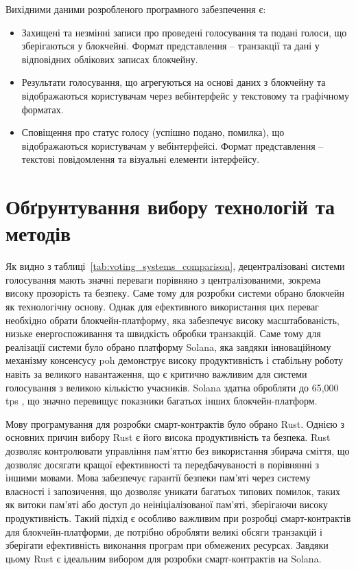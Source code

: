\documentclass[14pt]{extreport}
\begin{document}
  Вихідними даними розробленого програмного забезпечення є:
  
  \begin{itemize}
    \item Захищені та незмінні записи про проведені голосування та подані голоси, що зберігаються у блокчейні. Формат представлення – транзакції та дані у відповідних облікових записах блокчейну.
    \item Результати голосування, що агрегуються на основі даних з блокчейну та відображаються користувачам через вебінтерфейс у текстовому та графічному форматах.
    \item Сповіщення про статус голосу (успішно подано, помилка), що відображаються користувачам у вебінтерфейсі. Формат представлення – текстові повідомлення та візуальні елементи інтерфейсу.
  \end{itemize}
  
  \section{Обґрунтування вибору технологій та методів}
  
  Як видно з таблиці~\ref{tab:voting_systems_comparison}, децентралізовані системи голосування мають значні переваги порівняно з централізованими, зокрема високу прозорість та безпеку. Саме тому для розробки системи обрано блокчейн як технологічну основу. Однак для ефективного використання цих переваг необхідно обрати блокчейн-платформу, яка забезпечує високу масштабованість, низьке енергоспоживання та швидкість обробки транзакцій. Саме тому для реалізації системи було обрано платформу Solana, яка завдяки інноваційному механізму консенсусу \gls{poh} демонструє високу продуктивність і стабільну роботу навіть за великого навантаження, що є критично важливим для системи голосування з великою кількістю учасників. Solana здатна обробляти до 65,000 \gls{tps} \cite{solana_report}, що значно перевищує показники багатьох інших блокчейн-платформ.

  Мову програмування для розробки смарт-контрактів було обрано Rust. Однією з основних причин вибору Rust є його висока продуктивність та безпека. Rust дозволяє контролювати управління пам'яттю без використання збирача сміття, що дозволяє досягати кращої ефективності та передбачуваності в порівнянні з іншими мовами. Мова забезпечує гарантії безпеки пам'яті через систему власності і запозичення, що дозволяє уникати багатьох типових помилок, таких як витоки пам'яті або доступ до неініціалізованої пам'яті, зберігаючи високу продуктивність. Такий підхід є особливо важливим при розробці смарт-контрактів для блокчейн-платформи, де потрібно обробляти великі обсяги транзакцій і зберігати ефективність виконання програм при обмежених ресурсах. Завдяки цьому Rust є ідеальним вибором для розробки смарт-контрактів на Solana.
\end{document}
